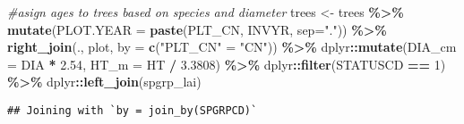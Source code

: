\documentclass[
]{article}
\newenvironment{Shaded}{\begin{snugshade}}{\end{snugshade}}
\newcommand{\AttributeTok}[1]{\textcolor[rgb]{0.13,0.29,0.53}{#1}}
\newcommand{\CommentTok}[1]{\textcolor[rgb]{0.56,0.35,0.01}{\textit{#1}}}
\newcommand{\DecValTok}[1]{\textcolor[rgb]{0.00,0.00,0.81}{#1}}
\newcommand{\FloatTok}[1]{\textcolor[rgb]{0.00,0.00,0.81}{#1}}
\newcommand{\FunctionTok}[1]{\textcolor[rgb]{0.13,0.29,0.53}{\textbf{#1}}}
\newcommand{\NormalTok}[1]{#1}
\newcommand{\OtherTok}[1]{\textcolor[rgb]{0.56,0.35,0.01}{#1}}
\newcommand{\SpecialCharTok}[1]{\textcolor[rgb]{0.81,0.36,0.00}{\textbf{#1}}}
\newcommand{\StringTok}[1]{\textcolor[rgb]{0.31,0.60,0.02}{#1}}
\begin{document}
\begin{Shaded}
\begin{Highlighting}[]
\CommentTok{\#asign ages to trees based on species and diameter}
\NormalTok{trees }\OtherTok{\textless{}{-}}\NormalTok{ trees }\SpecialCharTok{\%\textgreater{}\%}
  \FunctionTok{mutate}\NormalTok{(}\AttributeTok{PLOT.YEAR =} \FunctionTok{paste}\NormalTok{(PLT\_CN, INVYR, }\AttributeTok{sep=}\StringTok{"."}\NormalTok{)) }\SpecialCharTok{\%\textgreater{}\%}
  \FunctionTok{right\_join}\NormalTok{(., plot, }\AttributeTok{by =} \FunctionTok{c}\NormalTok{(}\StringTok{"PLT\_CN"} \OtherTok{=} \StringTok{"CN"}\NormalTok{)) }\SpecialCharTok{\%\textgreater{}\%}
\NormalTok{  dplyr}\SpecialCharTok{::}\FunctionTok{mutate}\NormalTok{(}\AttributeTok{DIA\_cm =}\NormalTok{ DIA }\SpecialCharTok{*} \FloatTok{2.54}\NormalTok{,}
                \AttributeTok{HT\_m =}\NormalTok{ HT }\SpecialCharTok{/} \FloatTok{3.3808}\NormalTok{) }\SpecialCharTok{\%\textgreater{}\%}
\NormalTok{  dplyr}\SpecialCharTok{::}\FunctionTok{filter}\NormalTok{(STATUSCD }\SpecialCharTok{==} \DecValTok{1}\NormalTok{) }\SpecialCharTok{\%\textgreater{}\%}
\NormalTok{  dplyr}\SpecialCharTok{::}\FunctionTok{left\_join}\NormalTok{(spgrp\_lai)}
\end{Highlighting}
\end{Shaded}

\begin{verbatim}
## Joining with `by = join_by(SPGRPCD)`
\end{verbatim}
\end{document}
